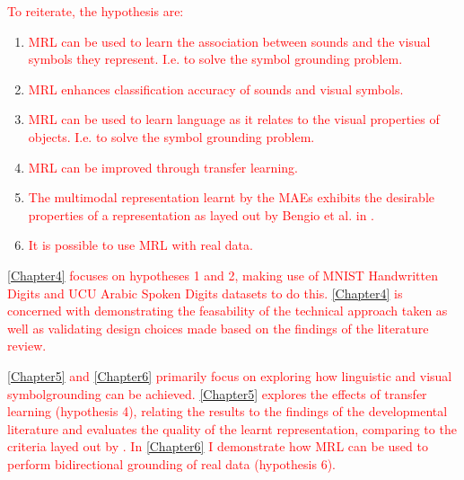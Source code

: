 \textcolor{red}{To reiterate, the hypothesis are:}

\begin{enumerate}

	\item \textcolor{red}{\ac{MRL} can be used to learn the association between sounds and the visual symbols they represent. I.e. to solve the symbol grounding problem.}
	\item \textcolor{red}{\ac{MRL} enhances classification accuracy of sounds and visual symbols.}
	\item \textcolor{red}{\ac{MRL} can be used to learn language as it relates to the visual properties of objects. I.e. to solve the symbol grounding problem.}
	\item \textcolor{red}{\ac{MRL} can be improved through transfer learning.}
	\item \textcolor{red}{The multimodal representation learnt by the \acp{MAE} exhibits the desirable properties of a representation as layed out by Bengio et al. in \cite{repRev}.}		
	\item \textcolor{red}{It is possible to use \ac{MRL} with real data.}
	
\end{enumerate}

\textcolor{red}{\autoref{Chapter4} focuses on hypotheses 1 and 2, making use of MNIST Handwritten Digits and UCU Arabic Spoken Digits datasets to do this. \autoref{Chapter4} is concerned with demonstrating the feasability of the technical approach taken as well as validating design choices made based on the findings of the literature review.}  

\textcolor{red}{ \autoref{Chapter5} and \autoref{Chapter6} primarily focus on exploring how linguistic and visual symbolgrounding can be achieved. \autoref{Chapter5} explores the effects of transfer learning (hypothesis 4), relating the results to the findings of the developmental literature and evaluates the quality of the learnt representation, comparing to the criteria layed out by \cite{repRev}. In \autoref{Chapter6} I demonstrate how \ac{MRL} can be used to perform bidirectional grounding of real data (hypothesis 6). } 

